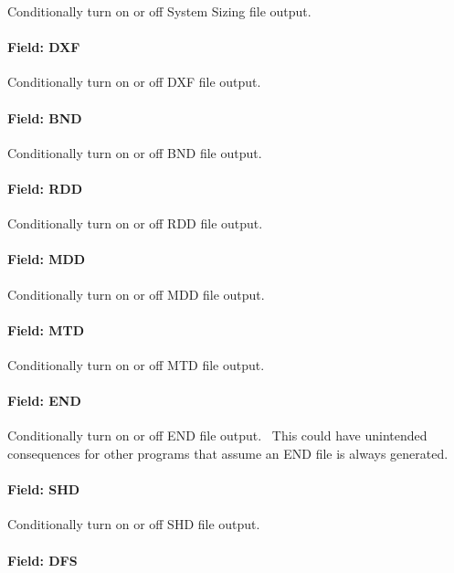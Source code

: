 Conditionally turn on or off System Sizing file output.

\paragraph{Field: DXF}\label{field-dxf}

Conditionally turn on or off DXF file output.

\paragraph{Field: BND}\label{field-bnd}

Conditionally turn on or off BND file output.

\paragraph{Field: RDD}\label{field-rdd}

Conditionally turn on or off RDD file output.

\paragraph{Field: MDD}\label{field-mdd}

Conditionally turn on or off MDD file output.

\paragraph{Field: MTD}\label{field-mtd}

Conditionally turn on or off MTD file output.

\paragraph{Field: END}\label{field-end}

Conditionally turn on or off END file output.~ This could have unintended consequences for other programs that assume an END file is always generated.

\paragraph{Field: SHD}\label{field-shd}

Conditionally turn on or off SHD file output.

\paragraph{Field: DFS}\label{field-dfs}


